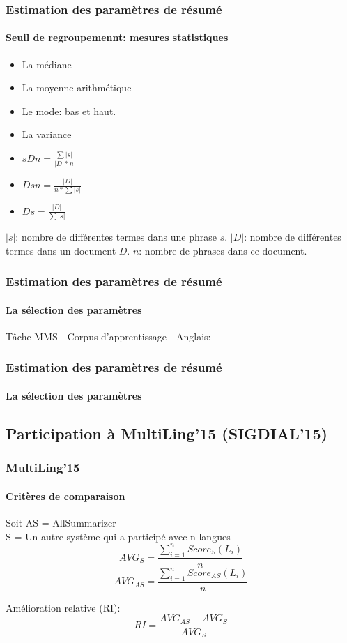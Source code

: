 \documentclass{beamer}
\begin{document}
\begin{frame}
\frametitle{Estimation des paramètres de résumé}
\framesubtitle{Seuil de regroupemennt: mesures statistiques}
\begin{itemize}
\item La médiane
\item La moyenne arithmétique
\item Le mode: bas et haut.
\item La variance
\item $ sDn = \frac{\sum |s|}{|D| * n}$ 
\item $ Dsn = \frac{|D|}{n * \sum |s|}$ 
\item $ Ds = \frac{|D|}{\sum |s|}$ 
\end{itemize}
$|s|$: nombre de différentes termes dans une phrase $s$. 
$|D|$: nombre de différentes termes dans un document $D$.
$n$: nombre de phrases dans ce document.
\end{frame}

\begin{frame}
\frametitle{Estimation des paramètres de résumé}
\framesubtitle{La sélection des paramètres}
Tâche MMS - Corpus d'apprentissage - Anglais:
\begin{center}
\tiny

\end{center}
\end{frame}

\begin{frame}
\frametitle{Estimation des paramètres de résumé}
\framesubtitle{La sélection des paramètres}

\begin{center}
\scriptsize

\end{center}
\end{frame}

\subsection{Participation à MultiLing'15 (SIGDIAL'15)}

\begin{frame}
\frametitle{MultiLing'15}
\framesubtitle{Critères de comparaison}

Soit AS = AllSummarizer\\
S = Un autre système qui a participé avec n langues\\

\[ AVG_{S} = \frac{\sum\limits_{i=1}^{n} Score_S(L_i)}{n} \]
\[ AVG_{AS} = \frac{\sum\limits_{i=1}^{n} Score_{AS}(L_i)}{n} \]

Amélioration relative (RI):
\[ RI = \frac{AVG_{AS} - AVG_{S}}{AVG_{S}} \]

\end{frame}
\end{document}
